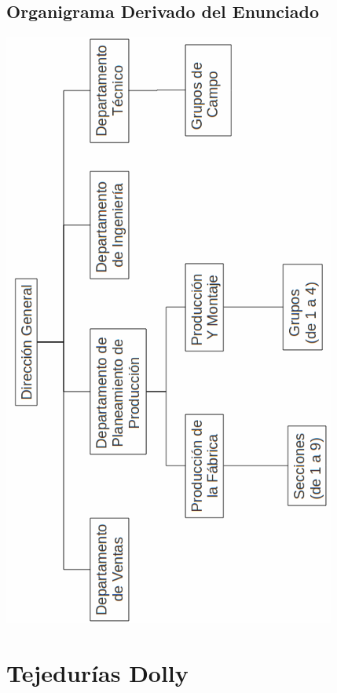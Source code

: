 \documentclass[a4paper,10pt,titlepage]{article}
\begin{document}
\subsection{Organigrama Derivado del Enunciado}
\begin{center}
\includegraphics[width=310pt]{./herculesDiag.png}
 \end{center}

\newpage
\section{Tejedur\'ias Dolly}
\end{document}
